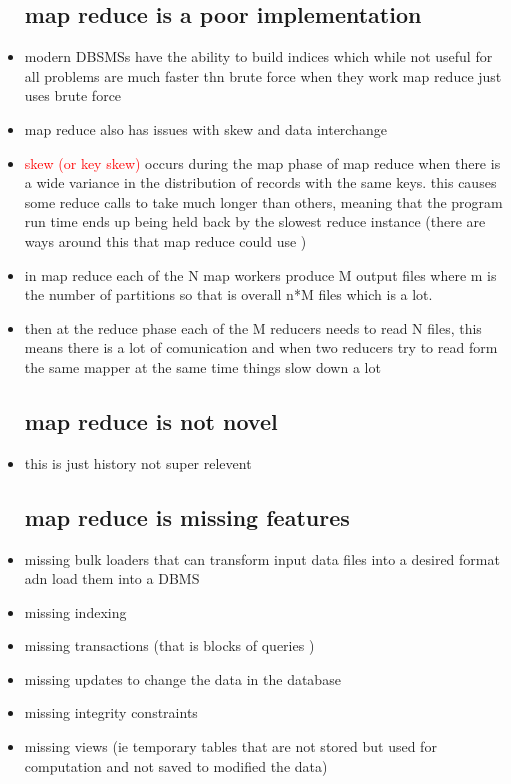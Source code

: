 \documentclass{article}
\begin{document}
\begin{itemize}
    \subsection*{map reduce is a poor implementation}
    \item modern DBSMSs have the ability to build indices which while not useful for all problems are much faster thn brute force when they work map reduce just uses brute force
    \item  map reduce also has issues with skew and data interchange
    \item \textcolor{red}{skew (or key skew)} occurs during the map phase of map reduce when there is a wide variance in the distribution of records with the same keys. this causes some reduce calls to take much longer than others, meaning that the program run time ends up being held back by the slowest reduce instance (there are ways around this that map reduce could use )
    \item in map reduce each of the N map workers produce M output files where m is the number of partitions so that is overall n*M files which is a lot. 
    \item then at the reduce phase each of the M reducers needs to read N files, this means there is a lot of comunication and when two reducers try to read form the same mapper at the same time things slow down a lot 
\subsection*{map reduce is not novel}
\item this is just history not super relevent 
\subsection*{map reduce is missing features}
\item missing bulk loaders that can transform input data files into a desired format adn load them into a DBMS 
\item missing indexing 
\item missing transactions (that is blocks of queries )
\item missing updates to change the data in the database 
\item missing integrity constraints 
\item missing views (ie temporary tables that are not stored but used for computation and not saved to modified the data)

\end{itemize}
\end{document}
